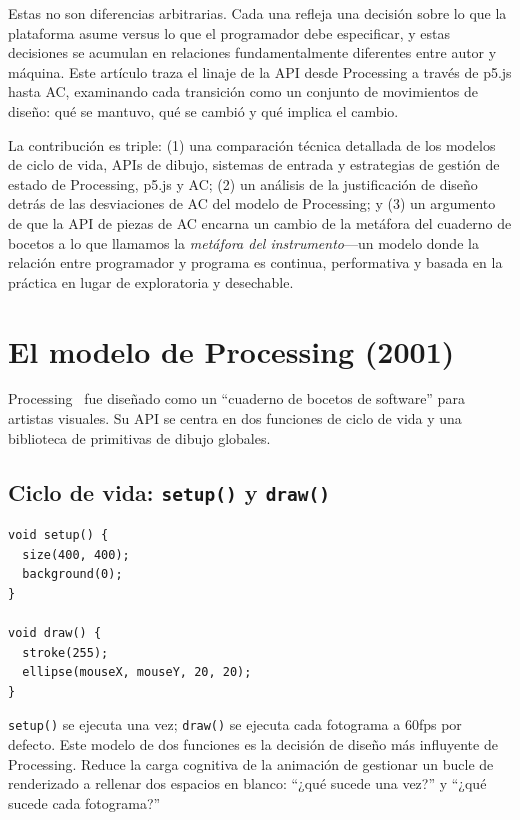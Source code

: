 \documentclass[10pt,letterpaper,twocolumn]{article}
\begin{document}
Estas no son diferencias arbitrarias. Cada una refleja una decisión sobre lo que la plataforma asume versus lo que el programador debe especificar, y estas decisiones se acumulan en relaciones fundamentalmente diferentes entre autor y máquina. Este artículo traza el linaje de la API desde Processing a través de p5.js hasta AC, examinando cada transición como un conjunto de movimientos de diseño: qué se mantuvo, qué se cambió y qué implica el cambio.

La contribución es triple: (1) una comparación técnica detallada de los modelos de ciclo de vida, APIs de dibujo, sistemas de entrada y estrategias de gestión de estado de Processing, p5.js y AC; (2) un análisis de la justificación de diseño detrás de las desviaciones de AC del modelo de Processing; y (3) un argumento de que la API de piezas de AC encarna un cambio de la metáfora del cuaderno de bocetos a lo que llamamos la \emph{metáfora del instrumento}---un modelo donde la relación entre programador y programa es continua, performativa y basada en la práctica en lugar de exploratoria y desechable.


\section{El modelo de Processing (2001)}
\label{sec:processing}

Processing~\citep{reas2007processing} fue diseñado como un ``cuaderno de bocetos de software'' para artistas visuales. Su API se centra en dos funciones de ciclo de vida y una biblioteca de primitivas de dibujo globales.

\subsection{Ciclo de vida: \texttt{setup()} y \texttt{draw()}}

\begin{lstlisting}[style=processingstyle,caption={Sketch mínimo de Processing.}]
void setup() {
  size(400, 400);
  background(0);
}

void draw() {
  stroke(255);
  ellipse(mouseX, mouseY, 20, 20);
}
\end{lstlisting}

\texttt{setup()} se ejecuta una vez; \texttt{draw()} se ejecuta cada fotograma a 60fps por defecto. Este modelo de dos funciones es la decisión de diseño más influyente de Processing. Reduce la carga cognitiva de la animación de gestionar un bucle de renderizado a rellenar dos espacios en blanco: ``¿qué sucede una vez?'' y ``¿qué sucede cada fotograma?''
\end{document}
